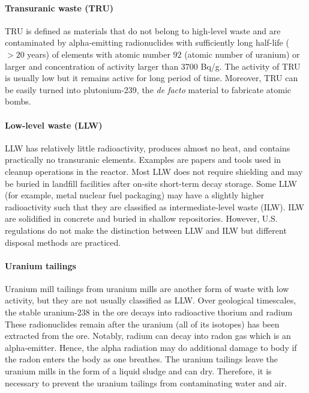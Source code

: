 \documentclass[nofootinbib,preprint,aps]{revtex4-1}
\begin{document}
    \paragraph{Transuranic waste (TRU)}
    TRU is defined as materials that do not belong to high-level waste and are
    contaminated by alpha-emitting radionuclides with
    sufficiently long half-life ($>20$ years) of elements with atomic number $92$ (atomic number of uranium)
    or larger and concentration of activity larger than $3700$ Bq/g.\cite{j83,s01} The activity
    of TRU is usually low but it remains active for long period of time. Moreover, TRU can be easily turned
    into plutonium-239, the {\it de facto} material to fabricate atomic bombs.

    \paragraph{Low-level waste (LLW)}
    LLW has relatively little radioactivity, produces almost no heat,
    and contains practically no
    transuranic elements. Examples are papers and tools used in cleanup operations in the reactor.
    Most LLW does not require shielding and may be buried in landfill 
    facilities after on-site short-term decay storage.
    Some LLW (for example, metal nuclear fuel packaging) may have a slightly
    higher radioactivity such that they are classified
    as intermediate-level waste (ILW). ILW are solidified in concrete and buried in shallow
    repositories.\cite{s01} However, U.S. regulations do not make the distinction
    between LLW and ILW but different disposal methods are practiced.\cite{nrc09, s01}

    \paragraph{Uranium tailings}
    Uranium mill tailings from uranium mills are another form of waste with low activity, but
    they are not usually classified as LLW.
    Over geological timescales, the stable uranium-238 in the ore decays into radioactive thorium and radium 
    These radionuclides remain after the uranium (all of its isotopes)
    has been extracted from the ore. Notably, radium
    can decay into radon gas which is an alpha-emitter. Hence, the alpha radiation may do additional
    damage to body if the radon enters the body as one breathes.
    The uranium tailings leave the uranium mills in the form of a liquid sludge
    and can dry. Therefore, it is necessary to prevent the uranium tailings
    from contaminating water and air.
    
\end{document}
